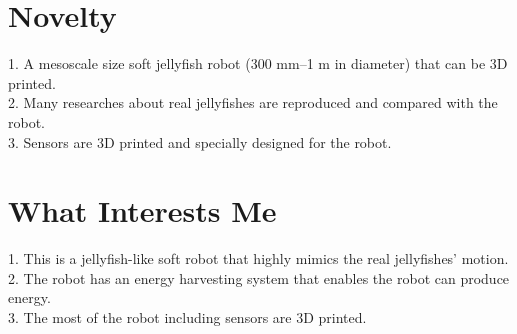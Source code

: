 \documentclass{article}
\begin{document}
\section*{Novelty}
1. A mesoscale size soft jellyfish robot (300 mm–1 m in diameter) that can be 3D printed. \\
2. Many researches about real jellyfishes are reproduced and compared with the robot.\\
3. Sensors are 3D printed and specially designed for the robot.\\

\section*{What Interests Me}
1. This is a jellyfish-like soft robot that highly mimics the real jellyfishes' motion.\\
2. The robot has an energy harvesting system that enables the robot can produce energy.\\
3. The most of the robot including sensors are 3D printed.\\
\end{document}
